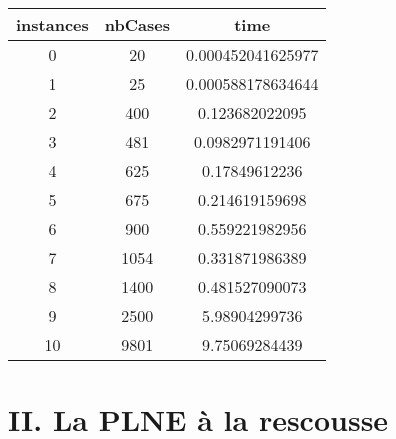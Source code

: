 \documentclass[a4paper]{memoir}
\begin{document}
\begin{tabular}{|c||c||c|}
\hline
instances & nbCases & time \\ 
\hline
0 & 20 & 0.000452041625977 \\ 
\hline
1 & 25 & 0.000588178634644 \\ 
\hline
2 & 400 & 0.123682022095 \\ 
\hline
3 & 481 & 0.0982971191406 \\ 
\hline
4 & 625 & 0.17849612236 \\ 
\hline
5 & 675 & 0.214619159698 \\ 
\hline
6 & 900 & 0.559221982956 \\ 
\hline
7 & 1054 & 0.331871986389 \\ 
\hline
8 & 1400 & 0.481527090073 \\ 
\hline
9 & 2500 & 5.98904299736 \\ 
\hline
10 & 9801 & 9.75069284439 \\ 
\hline
\end{tabular}







 	
 	\newpage
 	\section{II. La PLNE à la rescousse}
\end{document}
